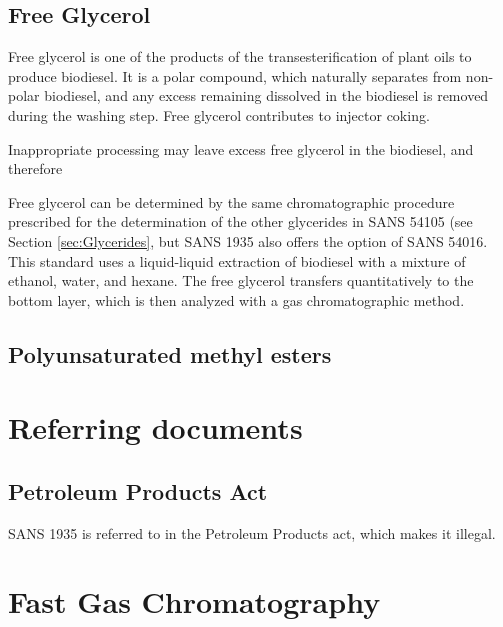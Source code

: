 \subsection{Free Glycerol}

Free glycerol is one of the products of the transesterification of plant oils to
produce biodiesel. It is a polar compound, which naturally separates from
non-polar biodiesel, and any excess remaining dissolved in the biodiesel is
removed during the washing step. Free glycerol contributes to injector coking. 

Inappropriate processing may leave excess free glycerol in the biodiesel, and therefore

Free glycerol can be determined by the same chromatographic procedure prescribed
for the determination of the other glycerides in SANS 54105 (see Section
\ref{sec:Glycerides}, but SANS 1935 also offers the option of SANS 54016. This
standard uses a liquid-liquid extraction of biodiesel with a mixture of ethanol,
water, and hexane. The free glycerol transfers quantitatively to the bottom
layer, which is then analyzed with a gas chromatographic method.


\subsection{Polyunsaturated methyl esters}
\label{sec:ChromDetUnsat}

\section{Referring documents}

\subsection{Petroleum Products Act}

SANS 1935 is referred to in the Petroleum Products act, which makes it illegal. 

\section{Fast Gas Chromatography}


\todos